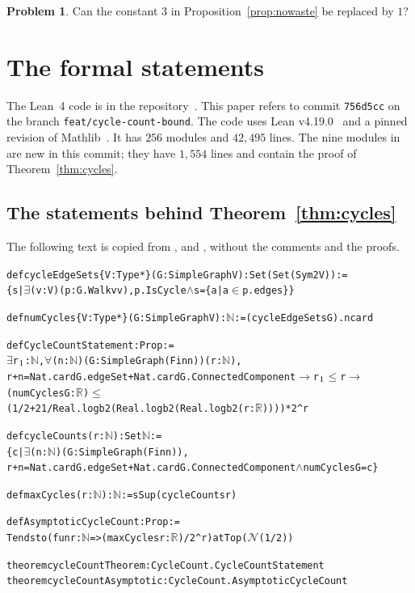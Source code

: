\documentclass[11pt]{article}
\theoremstyle{definition}
\newtheorem{problem}[theorem]{Problem}
\theoremstyle{remark}
\numberwithin{equation}{section}
\begin{document}
\begin{problem}
Can the constant $3$ in Proposition~\ref{prop:nowaste} be replaced by $1$?
\end{problem}

\appendix

\section{The formal statements}\label{app:lean}

The Lean~4 code is in the repository~\cite{Repo}. This paper refers to commit
\texttt{756d5cc} on the branch \texttt{feat/cycle-count-bound}. The
code uses Lean v4.19.0~\cite{Lean4} and a pinned revision of Mathlib~\cite{Mathlib}. It has $256$
modules and $42{,}495$ lines. The nine modules in  are new in this
commit; they have $1{,}554$ lines and contain the proof of Theorem~\ref{thm:cycles}.

\subsection{The statements behind Theorem~\ref{thm:cycles}}

The following text is copied from ,
 and , without the comments and the proofs.

{\small
\begin{alltt}
def cycleEdgeSets \{V : Type*\} (G : SimpleGraph V) : Set (Set (Sym2 V)) :=
  \{s | \(\exists\) (v : V) (p : G.Walk v v), p.IsCycle \(\land\) s = \{a | a \(\in\) p.edges\}\}

def numCycles \{V : Type*\} (G : SimpleGraph V) : \(\mathbb{N}\) := (cycleEdgeSets G).ncard

def CycleCountStatement : Prop :=
  \(\exists\) r\(\sb{1}\) : \(\mathbb{N}\), \(\forall\) (n : \(\mathbb{N}\)) (G : SimpleGraph (Fin n)) (r : \(\mathbb{N}\)),
    r + n = Nat.card G.edgeSet + Nat.card G.ConnectedComponent \(\to\) r\(\sb{1}\) \(\le\) r \(\to\)
    (numCycles G : \(\mathbb{R}\)) \(\le\)
      (1 / 2 + 21 / Real.logb 2 (Real.logb 2 (Real.logb 2 (r : \(\mathbb{R}\))))) * 2 ^ r

def cycleCounts (r : \(\mathbb{N}\)) : Set \(\mathbb{N}\) :=
  \{c | \(\exists\) (n : \(\mathbb{N}\)) (G : SimpleGraph (Fin n)),
    r + n = Nat.card G.edgeSet + Nat.card G.ConnectedComponent \(\land\) numCycles G = c\}

def maxCycles (r : \(\mathbb{N}\)) : \(\mathbb{N}\) := sSup (cycleCounts r)

def AsymptoticCycleCount : Prop :=
  Tendsto (fun r : \(\mathbb{N}\) => (maxCycles r : \(\mathbb{R}\)) / 2 ^ r) atTop (\(\mathcal{N}\) (1 / 2))

theorem cycleCountTheorem : CycleCount.CycleCountStatement
theorem cycleCountAsymptotic : CycleCount.AsymptoticCycleCount
\end{alltt}}
\end{document}
